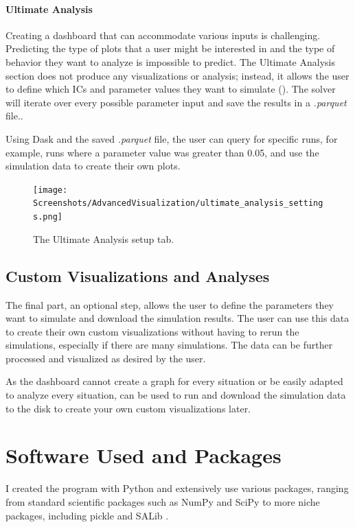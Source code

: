 \paragraph{Ultimate Analysis}
\label{sec:ultimate_analysis}
Creating a dashboard that can accommodate various inputs is challenging. 
Predicting the type of plots that a user might be interested in and the type of behavior they want to analyze is impossible to predict. 
The Ultimate Analysis section does not produce any visualizations or analysis; instead, it allows the user to define which ICs and parameter values they want to simulate ().
The solver will iterate over every possible parameter input and save the results in a \textit{.parquet} file..

Using Dask and the saved \textit{.parquet} file, the user can query for specific runs, for example, runs where a parameter value was greater than 0.05, and use the simulation data to create their own plots.
\begin{figure}
    \centering
    \texttt{[image: Screenshots/AdvancedVisualization/ultimate\_analysis\_settings.png]}
    \caption{
        The Ultimate Analysis setup tab. 
    }
    \label{fig:ss:av:ultimate_analysis_settings}
\end{figure}

\subsection{Custom Visualizations and Analyses} 
\label{sec:custom_visualizations_and_framework}
The final part, an optional step, allows the user to define the parameters they want to simulate and download the simulation results. 
The user can use this data to create their own custom visualizations without having to rerun the simulations, especially if there are many simulations. 
The data can be further processed and visualized as desired by the user. 

As the dashboard cannot create a graph for every situation or be easily adapted to analyze every situation,  can be used to run and download the simulation data to the disk to create your own custom visualizations later. 

\section{Software Used and Packages}
I created the program with Python \cite{Python} and extensively use various packages, ranging from standard scientific packages such as NumPy \cite{NumPy} and SciPy to more niche packages, including pickle and SALib \cite{iwanagaSALib20Advancing2022, hermanSALibOpensourcePython2017}.

